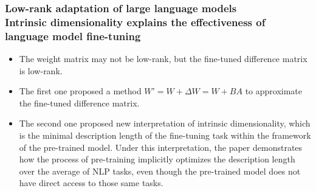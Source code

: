 \documentclass[aspectratio=169]{beamer}
\begin{document}
\begin{frame}
    \frametitle{Low-rank adaptation of large language models \\ Intrinsic dimensionality explains the effectiveness of language model fine-tuning}

    \begin{itemize}
        \item The weight matrix may not be low-rank, but the fine-tuned difference matrix is low-rank.
        \item The first one proposed a method $ W' = W + \Delta W = W + BA$ to approximate the fine-tuned difference matrix.
        \item The second one proposed new interpretation of intrinsic dimensionality, which is the minimal description length of the fine-tuning task within the framework of the pre-trained model. Under this interpretation, the paper demonstrates how the process of pre-training implicitly optimizes the description length over the average of NLP tasks, even though the pre-trained model does not have direct access to those same tasks.
    \end{itemize}
\end{frame}
\end{document}

